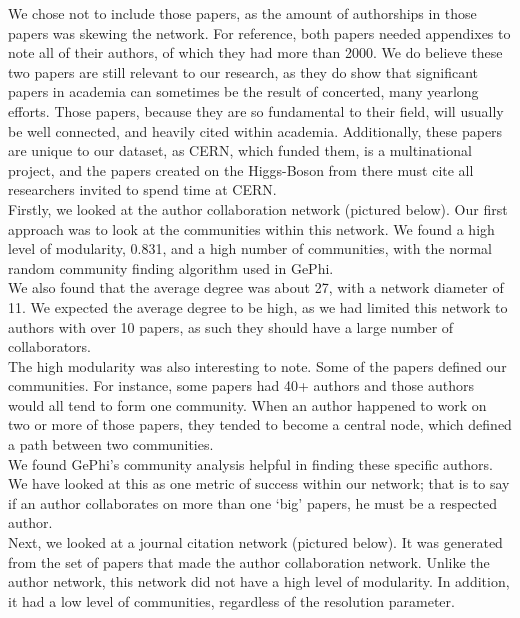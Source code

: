 \documentclass[times, 10pt,twocolumn]{article}
\begin{document}
We chose not to include those papers, as the amount of authorships in those papers was skewing the network. For reference, both papers needed appendixes to note all of their authors, of which they had more than 2000. We do believe these two papers are still relevant to our research, as they do show that significant papers in academia can sometimes be the result of concerted, many yearlong efforts. Those papers, because they are so fundamental to their field, will usually be well connected, and heavily cited within academia. Additionally, these papers are unique to our dataset, as CERN, which funded them, is a multinational project, and the papers created on the Higgs-Boson from there must cite all researchers invited to spend time at CERN.\\

Firstly, we looked at the author collaboration network (pictured below). Our first approach was to look at the communities within this network. We found a high level of modularity, 0.831, and a high number of communities, with the normal random community finding algorithm used in GePhi. \\

We also found that the average degree was about 27, with a network diameter of 11. We expected the average degree to be high, as we had limited this network to authors with over 10 papers, as such they should have a large number of collaborators. \\

The high modularity was also interesting to note. Some of the papers defined our communities. For instance, some papers had 40+ authors and those authors would all tend to form one community. When an author happened to work on two or more of those papers, they tended to become a central node, which defined a path between two communities. \\

We found GePhi’s community analysis helpful in finding these specific authors. We have looked at this as one metric of success within our network; that is to say if an author collaborates on more than one ‘big’ papers, he must be a respected author. \\

Next, we looked at a journal citation network (pictured below). It was generated from the set of papers that made the author collaboration network. Unlike the author network, this network did not have a high level of modularity. In addition, it had a low level of communities, regardless of the resolution parameter.\\
\end{document}
